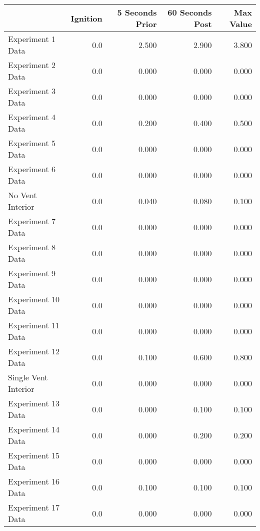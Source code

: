 \begin{tabular}{lrrrr}
\toprule
{} &  Ignition &  5 Seconds Prior &  60 Seconds Post &  Max Value \\
\midrule
Experiment 1 Data    &       0.0 &            2.500 &            2.900 &      3.800 \\
Experiment 2 Data    &       0.0 &            0.000 &            0.000 &      0.000 \\
Experiment 3 Data    &       0.0 &            0.000 &            0.000 &      0.000 \\
Experiment 4 Data    &       0.0 &            0.200 &            0.400 &      0.500 \\
Experiment 5 Data    &       0.0 &            0.000 &            0.000 &      0.000 \\
Experiment 6 Data    &       0.0 &            0.000 &            0.000 &      0.000 \\
No Vent Interior     &       0.0 &            0.040 &            0.080 &      0.100 \\
Experiment 7 Data    &       0.0 &            0.000 &            0.000 &      0.000 \\
Experiment 8 Data    &       0.0 &            0.000 &            0.000 &      0.000 \\
Experiment 9 Data    &       0.0 &            0.000 &            0.000 &      0.000 \\
Experiment 10 Data   &       0.0 &            0.000 &            0.000 &      0.000 \\
Experiment 11 Data   &       0.0 &            0.000 &            0.000 &      0.000 \\
Experiment 12 Data   &       0.0 &            0.100 &            0.600 &      0.800 \\
Single Vent Interior &       0.0 &            0.000 &            0.000 &      0.000 \\
Experiment 13 Data   &       0.0 &            0.000 &            0.100 &      0.100 \\
Experiment 14 Data   &       0.0 &            0.000 &            0.200 &      0.200 \\
Experiment 15 Data   &       0.0 &            0.000 &            0.000 &      0.000 \\
Experiment 16 Data   &       0.0 &            0.100 &            0.100 &      0.100 \\
Experiment 17 Data   &       0.0 &            0.000 &            0.000 &      0.000 \\

\end{tabular}
